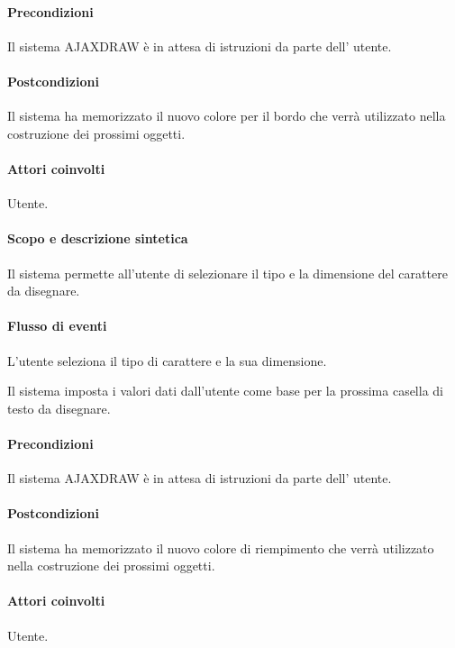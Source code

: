 \paragraph{Precondizioni} Il sistema AJAXDRAW \`e in attesa di istruzioni da parte dell' utente.
\paragraph{Postcondizioni} Il sistema ha memorizzato il nuovo colore per il bordo che verr\`a utilizzato nella costruzione dei prossimi oggetti.

\paragraph{Attori coinvolti} Utente.
\paragraph{Scopo e descrizione sintetica} 
Il sistema permette all'utente di selezionare il tipo e la dimensione del carattere da disegnare.
\paragraph{Flusso di eventi}
\begin{elenconumerato}[\textbf{}]{\subsubsecindent}
\item L'utente seleziona il tipo di carattere e la sua dimensione.
\item Il sistema imposta i valori dati dall'utente come base per la prossima casella di testo da disegnare.
\end{elenconumerato}
\paragraph{Precondizioni} Il sistema AJAXDRAW \`e in attesa di istruzioni da parte dell' utente.
\paragraph{Postcondizioni} Il sistema ha memorizzato il nuovo colore di riempimento che verr\`a utilizzato nella costruzione dei prossimi oggetti.

\paragraph{Attori coinvolti} Utente.

